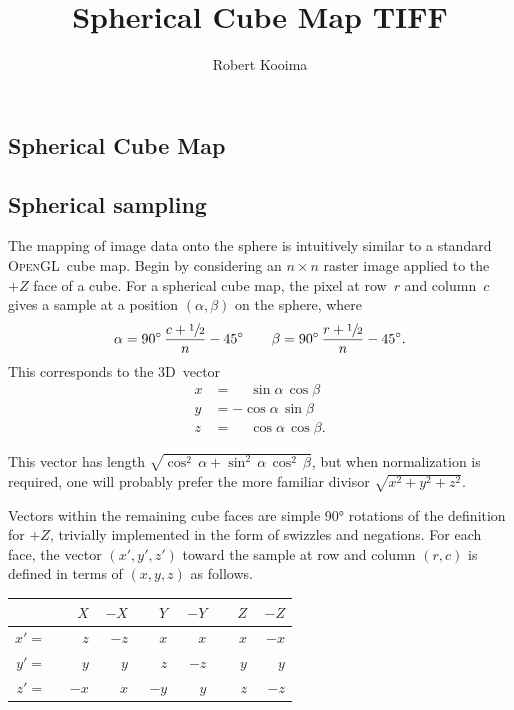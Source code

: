 \documentclass[oneside,10pt]{memoir}
\newcommand{\threed}  {3D}
\newcommand{\opengl}  {\textsc{OpenGL}}
\newcommand{\B}{\bigstrut[b]}
\newcommand{\T}{\bigstrut[t]}
\newcommand{\Pos}[1]{\phantom{-}{#1}}
\newcommand{\Neg}[1]{        {-}{#1}}
\begin{document}
\title{Spherical Cube Map TIFF}
\author{Robert Kooima}
\maketitle
\begin{Spacing}{1.1}





\chapter{Spherical Cube Map}

\section{Spherical sampling}
\label{sec:sampling}

The mapping of image data onto the sphere is intuitively similar to a standard \opengl\ cube map. Begin by considering an $n\times n$ raster image applied to the $+Z$ face of a cube. For a spherical cube map, the pixel at row~$r$ and column~$c$ gives a sample at a position $(\alpha, \beta)$ on the sphere, where
\[\alpha=90^{\circ}\,\frac{c + \sfrac{1}{2}}{n} - 45^{\circ}\qquad\beta=90^{\circ}\,\frac{r + \sfrac{1}{2}}{n} - 45^{\circ}.\]
This corresponds to the \threed\ vector
\begin{align*}
x& = \phantom{-}\sin\alpha\, \cos\beta\\
y& =         {-}\cos\alpha\, \sin\beta\\
z& = \phantom{-}\cos\alpha\, \cos\beta.
\end{align*}

This vector has length \(\sqrt{\cos^2\,\alpha + \sin^2\,\alpha\,\cos^2\,\beta}\), but when normalization is required, one will probably prefer the more familiar divisor \(\sqrt{x^2+y^2+z^2}\).

Vectors within the remaining cube faces are simple \ang{90} rotations of the definition for $+Z$, trivially implemented in the form of swizzles and negations. For each face, the vector $(x', y', z')$ toward the sample at row and column $(r, c)$ is defined in terms of $(x, y, z)$ as follows.
\begin{center}
\begin{tabular}{rr|r|r|r|r|r}
    &$\Pos{X}$&$\Neg{X}$&$\Pos{Y}$&$\Neg{Y}$&$\Pos{Z}$&$\Neg{Z}$\B\\\hline
$x'=$&$\Pos{z}$&$\Neg{z}$&$\Pos{x}$&$\Pos{x}$&$\Pos{x}$&$\Neg{x}$\T\\
$y'=$&$\Pos{y}$&$\Pos{y}$&$\Pos{z}$&$\Neg{z}$&$\Pos{y}$&$\Pos{y}$\\
$z'=$&$\Neg{x}$&$\Pos{x}$&$\Neg{y}$&$\Pos{y}$&$\Pos{z}$&$\Neg{z}$\\
\end{tabular}
\end{center}


\end{Spacing}
\end{document}
